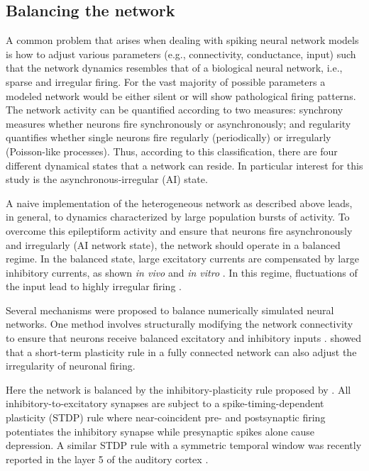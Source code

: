   \subsection{Balancing the network}
  \label{sec:balancing}
    A common problem that arises when dealing with spiking neural network models is how to adjust various parameters (e.g., connectivity, conductance, input) such that the network dynamics resembles that of a biological neural network, i.e., sparse and irregular firing.
    For the vast majority of possible parameters a modeled network would be either silent or will show pathological firing patterns.
    The network activity can be quantified according to two measures: synchrony measures whether neurons fire synchronously or asynchronously; and regularity quantifies whether single neurons fire regularly (periodically) or irregularly (Poisson-like processes).
    Thus, according to this classification, there are four different dynamical states that a network can reside.
    In particular interest for this study is the asynchronous-irregular (AI) state.

    A naive implementation of the heterogeneous network as described above leads, in general, to dynamics characterized by large population bursts of activity.
    To overcome this epileptiform activity and ensure that neurons fire asynchronously and irregularly (AI network state), the network should operate in a balanced regime.
    In the balanced state, large excitatory currents are compensated by large inhibitory currents, as shown \textit{in vivo} \citep{Okun2008, Cafaro2010} and \textit{in vitro} \citep{Xue2014}.
    In this regime, fluctuations of the input lead to highly irregular firing \citep{vanVreeswijk96,vanVreeswijk98}.
    
    Several mechanisms were proposed to balance numerically simulated neural networks.
    One method involves structurally modifying the network connectivity to ensure that neurons receive balanced excitatory and inhibitory inputs \citep{Renart2007, Roudi2007}.
    \cite{Barbieri2008} showed that a short-term plasticity rule \citep{Tsodyks97} in a fully connected network can also adjust the irregularity of neuronal firing.

    Here the network is balanced by the inhibitory-plasticity rule proposed by \cite{Vogels2011}.
    All inhibitory-to-excitatory synapses are subject to a spike-timing-dependent plasticity (STDP) rule where near-coincident pre- and postsynaptic firing potentiates the inhibitory synapse while presynaptic spikes alone cause depression.
    A similar STDP rule with a symmetric temporal window was recently reported in the layer 5 of the auditory cortex \citep{Damour2015}.

